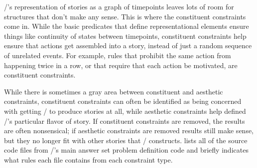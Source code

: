 \dunyazad/'s representation of stories as a graph of timepoints leaves lots of room for structures that don't make any sense.
%
This is where the constituent constraints come in.
%
While the basic predicates that define representational elements ensure things like continuity of states between timepoints, constituent constraints help ensure that actions get assembled into a story, instead of just a random sequence of unrelated events.
%
For example, rules that prohibit the same action from happening twice in a row,
or that require that each action be motivated, are constituent constraints.


While there is sometimes a gray area between constituent and aesthetic constraints, constituent constraints can often be identified as being concerned with getting \dunyazad/ to produce stories at all, while aesthetic constraints help defined \dunyazad/'s particular flavor of story.
%
If constituent constraints are removed, the results are often nonsensical; if aesthetic constraints are removed results still make sense, but they no longer fit with other stories that \dunyazad/ constructs.
%
 lists all of the source code files from \dunyazad/'s main answer set problem definition code and briefly indicates what rules each file contains from each constraint type.

